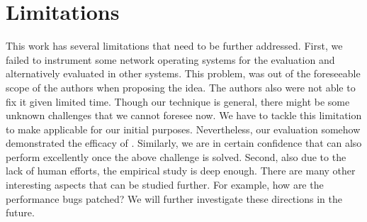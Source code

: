 \section{Limitations}
This work has several limitations that need to be further addressed.
%
First, we failed to instrument some network operating systems for the evaluation and alternatively evaluated in other systems.
%
This problem, was out of the foreseeable scope of the authors when proposing the idea.
%
The authors also were not able to fix it given limited time.
%
Though our technique is general, there might be some unknown challenges that we cannot foresee now.
%
We have to tackle this limitation to make \sys applicable for our initial purposes.
%
Nevertheless, our evaluation somehow demonstrated the efficacy of \sys.
%
Similarly, we are in certain confidence that \sys can also perform excellently once the above challenge is solved. 
%
Second, also due to the lack of human efforts, the empirical study is deep enough.
%
There are many other interesting aspects that can be studied further.
%
For example, how are the performance bugs patched?
%
We will further investigate these directions in the future.

